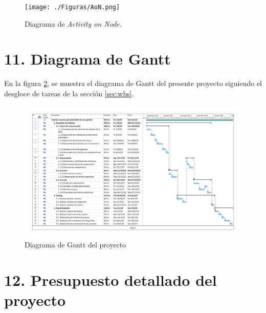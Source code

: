 \documentclass[
11pt, %
codirector, %
]{charter}
\begin{document}
\begin{landscape}
\begin{figure}[htpb]
\centering 
\texttt{[image: ./Figuras/AoN.png]}
\caption{Diagrama de \textit{Activity on Node}.}
\label{fig:AoN}
\end{figure}
\end{landscape}


\section{11. Diagrama de Gantt}
\label{sec:gantt}

En la figura \ref{fig:diagGantt}, se muestra el diagrama de Gantt del presente proyecto siguiendo el desgloce de tareas de la sección \ref{sec:wbs}.

\begin{landscape}
\begin{figure}[htpb]
\centering 
\includegraphics[height=.90\textheight]{./Figuras/gantt.pdf}
\caption{Diagrama de Gantt del proyecto}
\label{fig:diagGantt}
\end{figure}

\end{landscape}


\section{12. Presupuesto detallado del proyecto}
\label{sec:presupuesto}
\end{document}
